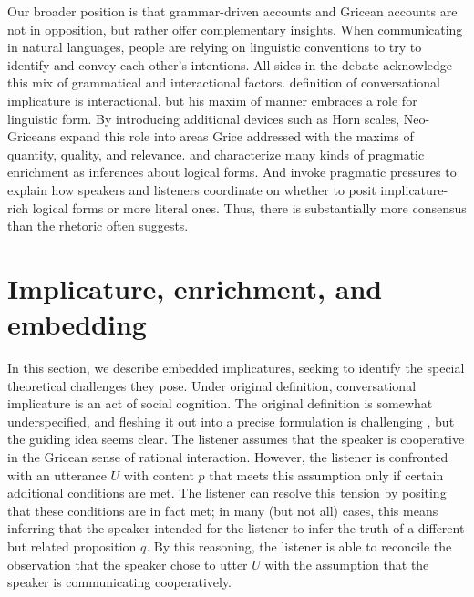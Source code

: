 \documentclass[leqno,12pt]{article}
\begin{document}
Our broader position is that grammar-driven accounts and Gricean
accounts are not in opposition, but rather offer complementary
insights.  When communicating in natural languages, people are relying
on linguistic conventions to try to identify and convey each other's
intentions. All sides in the debate acknowledge this mix of
grammatical and interactional factors.  definition
of conversational implicature is interactional, but his maxim of
manner embraces a role for linguistic form. By introducing additional
devices such as Horn scales, Neo-Griceans expand this role into areas
Grice addressed with the maxims of quantity, quality, and
relevance. \citet{Sperber95} and \citet{Bach94} characterize many
kinds of pragmatic enrichment as inferences about logical forms. And
\citet{ChierchiaFoxSpector08} invoke pragmatic pressures to explain
how speakers and listeners coordinate on whether to posit
implicature-rich logical forms or more literal ones. Thus, there is
substantially more consensus than the rhetoric often suggests.


\section{Implicature, enrichment, and embedding}\label{sec:implicature}

In this section, we describe embedded implicatures, seeking to
identify the special theoretical challenges they pose.  Under
 original definition, conversational implicature is
an act of social cognition. The original definition is somewhat
underspecified, and fleshing it out into a precise formulation is
challenging \citep{Hirschberg85}, but the guiding idea seems clear.
The listener assumes that the speaker is cooperative in the Gricean
sense of rational interaction. However, the listener is confronted
with an utterance $U$ with content $p$ that meets this assumption only
if certain additional conditions are met. The listener can resolve
this tension by positing that these conditions are in fact met; in
many (but not all) cases, this means inferring that the speaker
intended for the listener to infer the truth of a different but
related proposition $q$. By this reasoning, the listener is able to
reconcile the observation that the speaker chose to utter $U$ with the
assumption that the speaker is communicating cooperatively.
\end{document}
